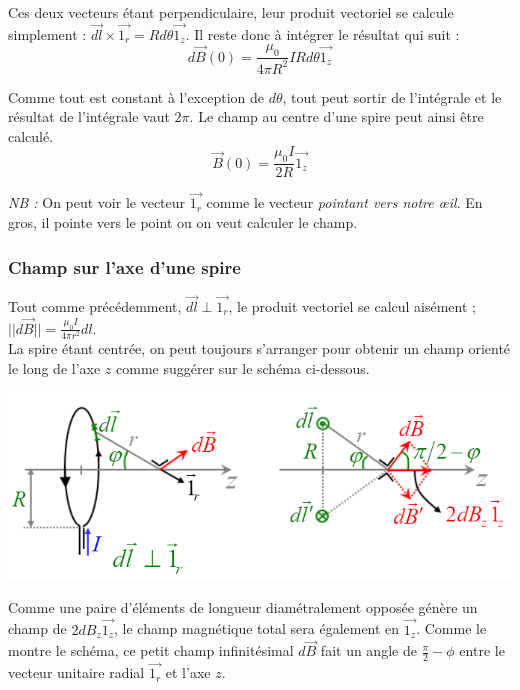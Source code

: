 \documentclass	[11pt, a4paper, openany]{book}
\begin{document}
Ces deux vecteurs étant perpendiculaire, leur produit vectoriel se calcule simplement : $\vec{dl} \times \vec{1_r} = Rd\theta\vec{1_z}$. Il reste donc à intégrer le résultat qui suit :
\begin{equation}
	d\vec{B}(0) = \frac{\mu_0}{4\pi R^2}IRd\theta\vec{1_z}
\end{equation}

Comme tout est constant à l'exception de $d\theta$, tout peut sortir de l'intégrale et le résultat de l'intégrale vaut $2\pi$. Le champ au centre d'une spire peut ainsi être calculé.
\begin{equation}
	\vec{B}(0) = \frac{\mu_0 I}{2R}\vec{1_z}
\end{equation}

\textit{NB :} On peut voir le vecteur $\vec{1_r}$ comme le vecteur \textit{pointant vers  notre œil}. En gros, il pointe vers le point ou on veut calculer le champ.

\subsubsection{Champ sur l'axe d'une spire}
Tout comme précédemment, $\vec{dl} \perp \vec{1_r}$, le produit vectoriel se calcul aisément ; $||d\vec{B}|| = \frac{\mu_0 I}{4\pi r^2}dl$.\\
La spire étant centrée, on peut toujours s'arranger pour obtenir un champ orienté le long de l'axe $z$ comme suggérer sur le schéma ci-dessous.

\begin{center}
	\includegraphics[scale=0.70]{magneto/image9.png}
\end{center}



Comme une paire d'éléments de longueur diamétralement opposée génère un champ de $2dB_z\vec{1_z}$, le champ magnétique total sera également en $\vec{1_z}$. Comme le montre le schéma, ce petit champ infinitésimal $d\vec{B}$ fait un angle de $\frac{\pi}{2} - \phi$ entre le vecteur unitaire radial $\vec{1_r}$ et l'axe $z$.\\
\end{document}
